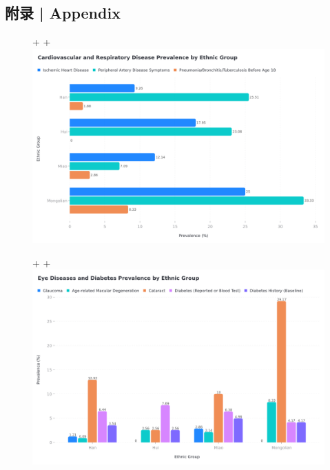 \documentclass[12pt,a4paper]{article}
\begin{document}
\begin{appendix}
\section{附录 | Appendix}

\begin{figure}[H]
+\hspace{-2cm}
+\includegraphics[width=1.2\textwidth]{only_big/cardiovascular_disease_bar_chart.png}
\end{figure}

\begin{figure}[H]
+\hspace{-2cm}
+\includegraphics[width=1.2\textwidth]{only_big/eye_disease_column_chart.png}
\end{figure}



\end{appendix}
\end{document}
